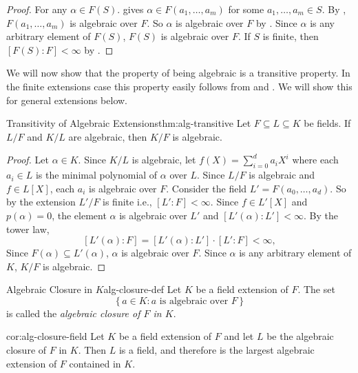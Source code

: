 \begin{proof}
  For any $\alpha\in F(S)$. 
   gives $\alpha\in F(a_1,\ldots,a_m)$ for some $a_1,\ldots,a_m\in S$. 
  By , $F(a_1,\ldots,a_m)$ is algebraic over $F$. 
  So $\alpha$ is algebraic over $F$ by . 
  Since $\alpha$ is any arbitrary element of $F(S)$, $F(S)$ is algebraic over $F$. 
  If $S$ is finite, then $[F(S):F]<\infty$ by \FinGenAlgthm.
\end{proof}

We will now show that the property of being algebraic is a transitive property. In the finite extensions case this property easily follows from  \TowerLawthm and \AlgDegreecor. We will show this for general extensions below. 

\begin{Theorem}{Transitivity of Algebraic Extensions}{thm:alg-transitive}
  Let $F\subseteq L\subseteq K$ be fields. If $L/F$ and $K/L$ are algebraic, then $K/F$ is algebraic.
\end{Theorem}
\begin{proof}
  Let $\alpha\in K$. 
  Since $K/L$ is algebraic, let $f(X)=\sum_{i=0}^da_iX^i$ where each $a_i\in L$ is the minimal polynomial of $\alpha$ over $L$. 
  Since $L/F$ is algebraic and $f\in L[X]$, each $a_i$ is algebraic over $F$. 
  Consider the field $L'=F(a_0,\dots, a_d)$. 
  So by  the extension $L'/F$ is finite i.e.,  $[L'\colon F]<\infty$. 
  Since $f\in L'[X]$ and $p(\alpha)=0$, the element $\alpha$ is algebraic over $L'$ and $[L'(\alpha)\colon L']<\infty$. 
  By the tower law,
  \[
    [L'(\alpha)\colon F] = [L'(\alpha)\colon L']\cdot[L'\colon F] < \infty,
  \]
  Since $F(\alpha)\subseteq L'(\alpha)$, $\alpha$ is algebraic over $F$. 
  Since $\alpha$ is any arbitrary element of $K$, $K/F$ is algebraic. 
\end{proof}

\begin{Definition}{Algebraic Closure in $K$}{alg-closure-def}
  Let $K$ be a field extension of $F$. The set
  \[
    \{\,a\in K : a\text{ is algebraic over }F\,\}
  \]
  is called the \emph{algebraic closure of $F$ in $K$}.
\end{Definition}

\begin{corolary}{}{cor:alg-closure-field}
  Let $K$ be a field extension of $F$ and let $L$ be the algebraic closure of $F$ in $K$. Then $L$ is a field, and therefore is the largest algebraic extension of $F$ contained in $K$.
\end{corolary}

